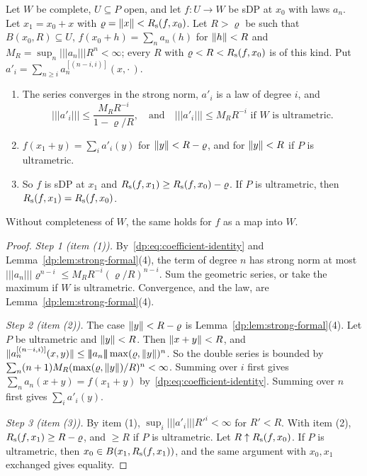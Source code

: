 \begin{theorem}\label{dp:thm:strong-recenter}
Let $W$ be complete, $U\subseteq P$ open, and let $f\colon U\to W$ be sDP at $x_0$ with laws $a_n$. Let $x_1=x_0+x$ with $\varrho=\lVert x\rVert<R_{\rm s}(f,x_0)$. Let $R>\varrho$ be such that $B(x_0,R)\subseteq U$, $f(x_0+h)=\sum_na_n(h)$ for $\lVert h\rVert<R$ and $M_R=\sup_n\lvert\!\lvert\!\lvert a_n\rvert\!\rvert\!\rvert R^n<\infty$; every $R$ with $\varrho<R<R_{\rm s}(f,x_0)$ is of this kind. Put $a'_i=\sum_{n\ge i}a_n^{[(n-i,i)]}(x,\cdot\,)$.
\begin{enumerate}
\item The series converges in the strong norm, $a'_i$ is a law of degree $i$, and
\[
 \lvert\!\lvert\!\lvert a'_i\rvert\!\rvert\!\rvert\le\frac{M_RR^{-i}}{1-\varrho/R},\quad\text{and}\quad\lvert\!\lvert\!\lvert a'_i\rvert\!\rvert\!\rvert\le M_RR^{-i}\text{ if $W$ is ultrametric.}
\]
\item $f(x_1+y)=\sum_ia'_i(y)$ for $\lVert y\rVert<R-\varrho$, and for $\lVert y\rVert<R$ if $P$ is ultrametric.
\item So $f$ is sDP at $x_1$ and $R_{\rm s}(f,x_1)\ge R_{\rm s}(f,x_0)-\varrho$. If $P$ is ultrametric, then $R_{\rm s}(f,x_1)=R_{\rm s}(f,x_0)$.
\end{enumerate}
Without completeness of $W$, the same holds for $f$ as a map into $\widehat W$.
\end{theorem}

\begin{proof}
\emph{Step 1 (item (1)).} By~\eqref{dp:eq:coefficient-identity} and Lemma~\ref{dp:lem:strong-formal}(4), the term of degree $n$ has strong norm at most $\lvert\!\lvert\!\lvert a_n\rvert\!\rvert\!\rvert\varrho^{n-i}\le M_RR^{-i}(\varrho/R)^{n-i}$. Sum the geometric series, or take the maximum if $W$ is ultrametric. Convergence, and the law, are Lemma~\ref{dp:lem:strong-formal}(4).

\emph{Step 2 (item (2)).} The case $\lVert y\rVert<R-\varrho$ is Lemma~\ref{dp:lem:strong-formal}(4). Let $P$ be ultrametric and $\lVert y\rVert<R$. Then $\lVert x+y\rVert<R$, and $\lVert a_n^{[(n-i,i)]}(x,y)\rVert\le\lvert\!\lvert\!\lvert a_n\rvert\!\rvert\!\rvert\max(\varrho,\lVert y\rVert)^n$. So the double series is bounded by $\sum_n(n+1)M_R(\max(\varrho,\lVert y\rVert)/R)^n<\infty$. Summing over $i$ first gives $\sum_na_n(x+y)=f(x_1+y)$ by~\eqref{dp:eq:coefficient-identity}. Summing over $n$ first gives $\sum_ia'_i(y)$.

\emph{Step 3 (item (3)).} By item (1), $\sup_i\lvert\!\lvert\!\lvert a'_i\rvert\!\rvert\!\rvert R'^i<\infty$ for $R'<R$. With item (2), $R_{\rm s}(f,x_1)\ge R-\varrho$, and $\ge R$ if $P$ is ultrametric. Let $R\uparrow R_{\rm s}(f,x_0)$. If $P$ is ultrametric, then $x_0\in B(x_1,R_{\rm s}(f,x_1))$, and the same argument with $x_0,x_1$ exchanged gives equality.
\end{proof}

